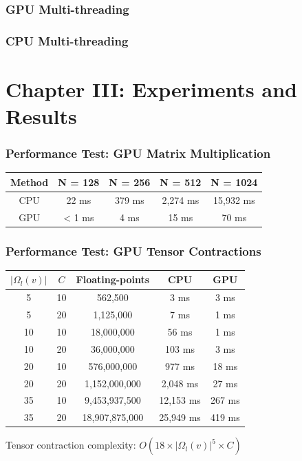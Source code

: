 \documentclass{beamer}
\begin{document}
\begin{frame}
\frametitle{GPU Multi-threading}
\end{frame}

\begin{frame}
\frametitle{CPU Multi-threading}
\end{frame}

\section{Chapter III: Experiments and Results}

\begin{frame}
\frametitle{Performance Test: GPU Matrix Multiplication}
\begin{center}
\begin{tabular}{||c | c | c | c | c ||}
	\hline
	Method & N = 128 & N = 256 & N = 512 & N = 1024 \\
	\hline\hline
	CPU & 22 ms & 379 ms & 2,274 ms & 15,932 ms \\
	\hline
	GPU & < 1 ms & 4 ms & 15 ms & 70 ms \\
	\hline
\end{tabular}
\end{center}
\end{frame}

\begin{frame}
\frametitle{Performance Test: GPU Tensor Contractions}
\begin{center}
\begin{tabular}{|| c | c | c | c | c ||}
	\hline
	$|\Omega_l(v)|$ & $C$ & Floating-points & CPU & GPU \\
	\hline\hline
	5 & 10 & 562,500 & 3 ms & 3 ms \\
	\hline
	5 & 20 & 1,125,000 & 7 ms & 1 ms \\
	\hline
	10 & 10 & 18,000,000 & 56 ms & 1 ms \\
	\hline
	10 & 20 & 36,000,000 & 103 ms & 3 ms \\
	\hline
	20 & 10 & 576,000,000 & 977 ms & 18 ms \\
	\hline 
	20 & 20 & 1,152,000,000 & 2,048 ms & 27 ms \\
	\hline
	35 & 10 & 9,453,937,500 & 12,153 ms & 267 ms \\
	\hline
	35 & 20 & 18,907,875,000 & 25,949 ms & 419 ms \\
	\hline
\end{tabular}
\end{center}
Tensor contraction complexity: $O(18 \times |\Omega_l(v)|^5 \times C)$
\end{frame}
\end{document}
